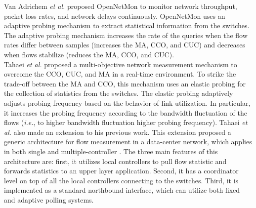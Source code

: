 Van Adrichem \textit{et al.} proposed OpenNetMon \cite{van_2014:OpenNetMon} to monitor network throughput, packet loss rates, and network delays continuously. OpenNetMon uses an adaptive probing mechanism to extract statistical information from the switches. The adaptive probing mechanism increases the rate of the queries when the flow rates differ between samples (increases the MA, CCO, and CUC) and decreases when flows stabilize (reduces the MA, CCO, and CUC).\\

Tahaei \textit{et al.} proposed a multi-objective network measurement mechanism \cite{tahaei_2017:multi-objective} to overcome the CCO, CUC, and MA in a real-time environment. To strike the trade-off between the MA and CCO, this mechanism uses an elastic probing for the collection of statistics from the switches. The elastic probing adaptively adjusts probing frequency based on the behavior of link utilization. In particular, it increases the probing frequency according to the bandwidth fluctuation of the flows (\textit{i.e.}, to higher bandwidth fluctuation higher probing frequency). Tahaei \textit{et al.} also made an extension to his previous work. This extension proposed a generic architecture for flow measurement in a data-center network, which applies in both single and multiple-controller \cite{tahaei_2018:cost_effective}. The three main features of this architecture are: first, it utilizes local controllers to pull flow statistic and forwards statistics to an upper layer application. Second, it has a coordinator level on top of all the local controllers connecting to the switches. Third, it is implemented as a standard northbound interface, which can utilize both fixed and adaptive polling systems.\\

